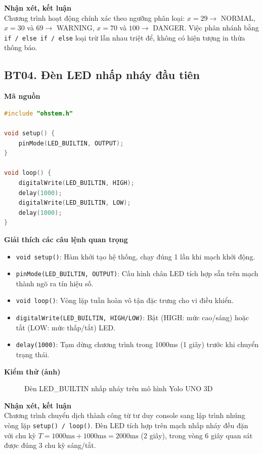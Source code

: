 \noindent\textbf{Nhận xét, kết luận}\\
Chương trình hoạt động chính xác theo ngưỡng phân loại: $x=29 \to$ NORMAL, $x=30$ và $69 \to$ WARNING, $x=70$ và $100 \to$ DANGER. Việc phân nhánh bằng \texttt{if / else if / else} loại trừ lẫn nhau triệt để, không có hiện tượng in thừa thông báo.


\subsection*{BT04. Đèn LED nhấp nháy đầu tiên}

\noindent\textbf{Mã nguồn}\\
\begin{lstlisting}[language=C]
#include "ohstem.h"

void setup() {
    pinMode(LED_BUILTIN, OUTPUT);
}

void loop() {
    digitalWrite(LED_BUILTIN, HIGH);
    delay(1000);
    digitalWrite(LED_BUILTIN, LOW);
    delay(1000);
}
\end{lstlisting}

\noindent\textbf{Giải thích các câu lệnh quan trọng}\\
\begin{itemize}
    \item \texttt{void setup()}: Hàm khởi tạo hệ thống, chạy đúng 1 lần khi mạch khởi động.
    \item \texttt{pinMode(LED\_BUILTIN, OUTPUT)}: Cấu hình chân LED tích hợp sẵn trên mạch thành ngõ ra tín hiệu số.
    \item \texttt{void loop()}: Vòng lặp tuần hoàn vô tận đặc trưng cho vi điều khiển.
    \item \texttt{digitalWrite(LED\_BUILTIN, HIGH/LOW)}: Bật (HIGH: mức cao/sáng) hoặc tắt (LOW: mức thấp/tắt) LED.
    \item \texttt{delay(1000)}: Tạm dừng chương trình trong 1000ms (1 giây) trước khi chuyển trạng thái.
\end{itemize}

\noindent\textbf{Kiểm thử (ảnh)}\\
\begin{figure}[H]
    \centering
    \caption{Đèn LED\_BUILTIN nhấp nháy trên mô hình Yolo UNO 3D}
    \label{fig:bt04}
\end{figure}

\noindent\textbf{Nhận xét, kết luận}\\
Chương trình chuyển dịch thành công từ tư duy console sang lập trình nhúng vòng lặp \texttt{setup() / loop()}. Đèn LED tích hợp trên mạch nhấp nháy đều đặn với chu kỳ $T = 1000\text{ms} + 1000\text{ms} = 2000\text{ms}$ (2 giây), trong vòng 6 giây quan sát được đúng 3 chu kỳ sáng/tắt.
